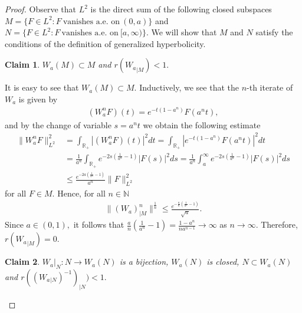 \documentclass[10pt,a4paper]{amsart}
\newtheorem{claim}{Claim}
\begin{document}
\begin{proof}  Observe that $L^2$ is the direct sum of the following closed subspaces $M=\{F\in L^2:F \ \text{vanishes a.e. on}\ (0,a) \}$ and $N=\{F\in L^2:F\ \text{vanishes a.e. on}\ [a, \infty) \}.$  We will show that $M$ and $N$ satisfy the conditions of the definition of generalized hyperbolicity. 

\begin{claim}
$W_a(M)\subset M$ and $r({W_a}_{|M})<1.$ 
\end{claim}
It is easy to see that $W_a(M)\subset M.$ Inductively, we see that the $n$-th iterate of $W_a$ is given by
\begin{align*}
(W_a^nF)(t)=e^{-t(1-a^n)}F(a^nt),
\end{align*}
and by the change of variable $s=a^nt$ we obtain the following estimate
\begin{align*}
\|W_a^n F\|^2_{L^2} & = \int_{\mathbb{R}_+} |(W_a^nF)(t)|^2 dt =\int_{\mathbb{R}_+} |e^{-t(1 - a^n)} F(a^nt)|^2 dt\\
&=\frac{1}{a^n} \int_{\mathbb{R}_+} e^{-2s( \frac{1}{a^n} - 1)} |F(s)|^2 ds  =  \frac{1}{a^n} \int_{a}^{\infty} e^{-2s( \frac{1}{a^n} - 1)} |F(s)|^2 ds \\
&\leq  \frac{e^{-2a( \frac{1}{a^n} - 1)}}{a^n}  \|F\|_{L^2}^2
\end{align*}
for all $F\in M.$ Hence, for all $n \in \mathbb{N}$
\begin{align*}
\|(W_a)^n_{|M}\|^{\frac{1}{n}} \leq  \frac{e^{-\frac{a}{n}( \frac{1}{a^n} - 1)}}{\sqrt{a}} .
\end{align*}
 Since $a\in(0,1),$ it follows that $\frac{a}{n}( \frac{1}{a^n} - 1) =  \frac{ 1 - a^n}{na^{n - 1}} \to  \infty$ as $n \to \infty.$ Therefore, $r({W_a}_{|M}) = 0$.


\begin{claim} ${W_a}|_{N}: N \to W_a(N)$ is a bijection, $W_a(N)$ is closed,  $N \subset W_a(N)$ and $r((W_a{_{|N}})^{-1})_{|N})< 1.$ 
\end{claim}


\end{proof}
\end{document}
